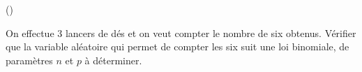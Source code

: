 \begin{exercice}\label{exo4-6} (\minsyndical)

On effectue 3 lancers de d\'es et on veut compter le nombre de six obtenus. V\'erifier que la variable al\'eatoire qui permet de compter les six suit une loi binomiale, de param\`etres $n$ et $p$ 
\`a d\'eterminer.\\


\end{exercice}
